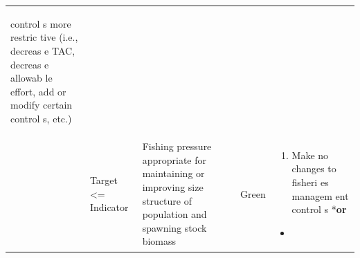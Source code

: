 \documentclass[]{book}
\providecommand{\tightlist}{%
  \setlength{\itemsep}{0pt}\setlength{\parskip}{0pt}}
\begin{document}
\begin{longtable}[]{@{}lllll@{}}
\begin{minipage}[t]{0.19\columnwidth}
\begin{enumerate}
  control s more restric tive (i.e., decreas e TAC, decreas e allowab le
  effort, add or modify certain control s, etc.)
\end{enumerate}\strut
\end{minipage}\tabularnewline
\begin{minipage}[t]{0.19\columnwidth}\raggedright\strut
\strut
\end{minipage} & \begin{minipage}[t]{0.19\columnwidth}\raggedright\strut
Target \textless{}= Indicator\strut
\end{minipage} & \begin{minipage}[t]{0.19\columnwidth}\raggedright\strut
Fishing pressure appropriate for maintaining or improving size structure
of population and spawning stock biomass\strut
\end{minipage} & \begin{minipage}[t]{0.19\columnwidth}\raggedright\strut
Green\strut
\end{minipage} & \begin{minipage}[t]{0.19\columnwidth}\raggedright\strut
\begin{enumerate}
\def\labelenumi{\arabic{enumi}.}
\tightlist
\item
  Make no changes to fisheri es managem ent control s *\textbf{or}
\end{enumerate}

\begin{itemize}
\item
\end{itemize}


\end{minipage}
\end{longtable}
\end{document}

